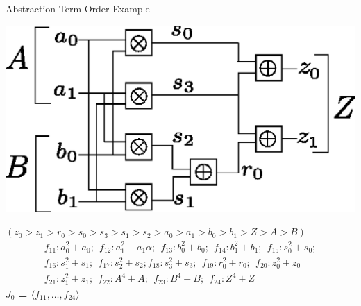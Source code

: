 \documentclass[xcolor=dvipsnames]{beamer}
\begin{document}
\begin{frame}{\large{Abstraction Term Order Example}}

\centerline{
\includegraphics[scale=0.4]{2bitmult.eps}
}
{\bf $(z_0 > z_1 > r_0 > s_0 > s_3 > s_1 > s_2 > a_0 > a_1 >  b_0 > b_1 > Z > A > B)$}
\begin{align*}
f_{11}: a_0^2+a_0; ~~f_{12}: a_1^2+a_1 \alpha; ~~f_{13}: b_0^2+b_0; ~~f_{14}: b_1^2+b_1; ~~f_{15}: s_0^2+s_0;  \nonumber \\
f_{16}: s_1^2+s_1; ~~f_{17}: s_2^2+s_2; f_{18}: s_3^2+s_3; ~~f_{19}: r_0^2+r_0; ~~f_{20}: z_0^2+z_0 \nonumber \\
f_{21}: z_1^2+z_1; ~~f_{22}: A^4+A; ~~f_{23}: B^4+B; ~~f_{24}:Z^4+Z \nonumber
\end{align*}
\vspace{-0.3in}
{\bf $J_0$ = $\langle f_{11}, \dots, f_{24} \rangle$}
\end{frame}

\end{document}

